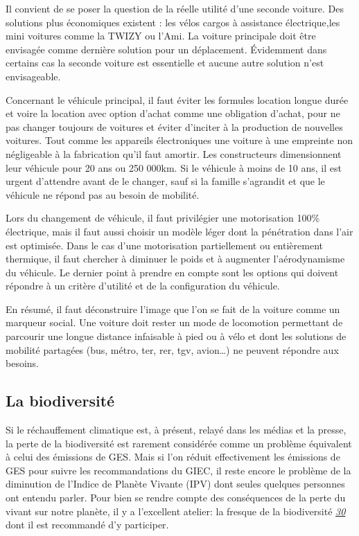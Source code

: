 Il convient de se poser la question de la réelle utilité d'une seconde
voiture. Des solutions plus économiques existent : les vélos cargos à
assistance électrique,les mini voitures comme la TWIZY ou l'Ami. La
voiture principale doit être envisagée comme dernière solution pour un
déplacement. Évidemment dans certains cas la seconde voiture est
essentielle et aucune autre solution n'est envisageable.

Concernant le véhicule principal, il faut éviter les formules location
longue durée et voire la location avec option d'achat comme une
obligation d'achat, pour ne pas changer toujours de voitures et éviter
d'inciter à la production de nouvelles voitures. Tout comme les
appareils électroniques une voiture à une empreinte non négligeable à la
fabrication qu'il faut amortir. Les constructeurs dimensionnent leur
véhicule pour 20 ans ou 250 000km. Si le véhicule à moins de 10 ans, il
est urgent d'attendre avant de le changer, sauf si la famille s'agrandit
et que le véhicule ne répond pas au besoin de mobilité.

Lors du changement de véhicule, il faut privilégier une motorisation
100\% électrique, mais il faut aussi choisir un modèle léger dont la
pénétration dans l'air est optimisée. Dans le cas d'une motorisation
partiellement ou entièrement thermique, il faut chercher à diminuer le
poids et à augmenter l'aérodynamisme du véhicule. Le dernier point à
prendre en compte sont les options qui doivent répondre à un critère
d'utilité et de la configuration du véhicule.

En résumé, il faut déconstruire l'image que l'on se fait de la voiture
comme un marqueur social. Une voiture doit rester un mode de locomotion
permettant de parcourir une longue distance infaisable à pied ou à vélo
et dont les solutions de mobilité partagées (bus, métro, ter, rer, tgv,
avion\ldots) ne peuvent répondre aux besoins.

\hypertarget{la-biodiversituxe9}{%
\subsection{La biodiversité}\label{la-biodiversituxe9}}

Si le réchauffement climatique est, à présent, relayé dans les médias et
la presse, la perte de la biodiversité est rarement considérée comme un
problème équivalent à celui des émissions de GES. Mais si l'on réduit
effectivement les émissions de GES pour suivre les recommandations du
GIEC, il reste encore le problème de la diminution de l'Indice de
Planète Vivante (IPV) dont seules quelques personnes ont entendu parler.
Pour bien se rendre compte des conséquences de la perte du vivant sur
notre planète, il y a l'excellent atelier: la fresque de la biodiversité
\emph{\href{https://www.fresquedelabiodiversite.org/}{30}} dont il est
recommandé d'y participer.

